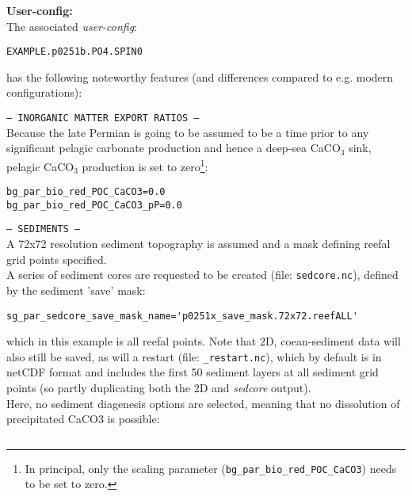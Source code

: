 \documentclass[10pt,twoside]{article}
\begin{document}
\noindent \textbf{User-config:} 
\\ The associated \textit{user-config}:
\vspace{-10pt}\begin{verbatim}EXAMPLE.p0251b.PO4.SPIN0\end{verbatim}\vspace{-10pt}
has the following noteworthy features (and differences compared to e.g. modern configurations):
\begin{compactitem}
                \item \texttt{--- INORGANIC MATTER EXPORT RATIOS ---}
                \\ Because the late Permian is going to be assumed to be a time prior to any significant pelagic carbonate production and hence a deep-sea CaCO$_{3}$ sink, pelagic CaCO$_{3}$ production is set to zero\footnote{In principal, only the scaling parameter (\texttt{bg\_par\_bio\_red\_POC\_CaCO3}) needs to be set to zero.}:
\vspace{-5pt}\begin{verbatim}
bg_par_bio_red_POC_CaCO3=0.0
bg_par_bio_red_POC_CaCO3_pP=0.0
                \end{verbatim}\vspace{-5pt}
                \item \texttt{--- SEDIMENTS ---}
                \\ A 72x72 resolution sediment topography is assumed and a mask defining reefal grid points specified.
                \\ A series of sediment cores are requested to be created (file: \texttt{sedcore.nc}), defined by the sediment 'save' mask:
\vspace{-5pt}\begin{verbatim}
sg_par_sedcore_save_mask_name='p0251x_save_mask.72x72.reefALL'
                \end{verbatim}\vspace{-5pt}
                which in this example is all reefal points. Note that 2D, coean-sediment data will also still be saved, as will a restart (file: \texttt{\_restart.nc}), which by default is in netCDF format and includes the first 50 sediment layers at all sediment grid points (so partly duplicating both the 2D and \textit{sedcore} output).
                \\ Here, no sediment diagenesis options are selected, meaning that no dissolution of precipitated CaCO3 is possible:
\vspace{-5pt}\begin{verbatim}

\end{verbatim}
\end{compactitem}
\end{document}
